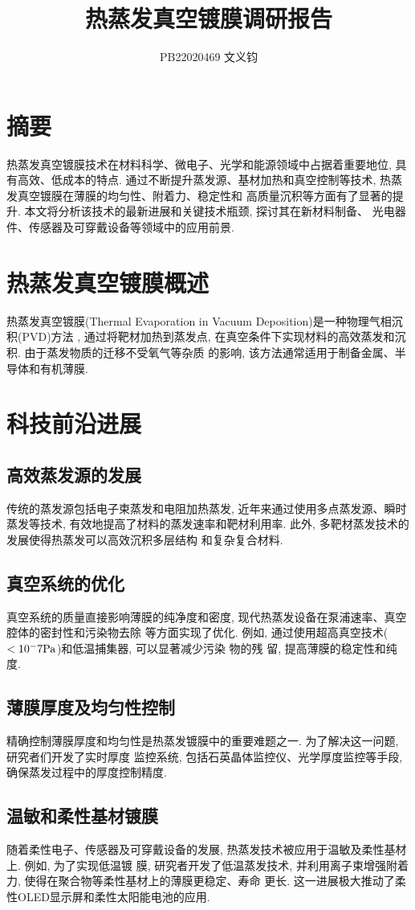\documentclass[UTF8]{ctexart}
\title{热蒸发真空镀膜调研报告}
\author{PB22020469 文义钧}
\begin{document}
\maketitle
\section{摘要}
热蒸发真空镀膜技术在材料科学、微电子、光学和能源领域中占据着重要地位, 具有高效、低成本的特点. 
通过不断提升蒸发源、基材加热和真空控制等技术, 热蒸发真空镀膜在薄膜的均匀性、附着力、稳定性和
高质量沉积等方面有了显著的提升. 本文将分析该技术的最新进展和关键技术瓶颈, 探讨其在新材料制备、
光电器件、传感器及可穿戴设备等领域中的应用前景. 
\section{热蒸发真空镀膜概述}
热蒸发真空镀膜(Thermal Evaporation in Vacuum Deposition)是一种物理气相沉积(PVD)方法
, 通过将靶材加热到蒸发点, 在真空条件下实现材料的高效蒸发和沉积. 由于蒸发物质的迁移不受氧气等杂质
的影响, 该方法通常适用于制备金属、半导体和有机薄膜. 
\section{科技前沿进展}
\subsection{高效蒸发源的发展}
传统的蒸发源包括电子束蒸发和电阻加热蒸发, 近年来通过使用多点蒸发源、瞬时蒸发等技术, 
有效地提高了材料的蒸发速率和靶材利用率. 此外, 多靶材蒸发技术的发展使得热蒸发可以高效沉积多层结构
和复杂复合材料. 
\subsection{真空系统的优化}
真空系统的质量直接影响薄膜的纯净度和密度, 现代热蒸发设备在泵浦速率、真空腔体的密封性和污染物去除
等方面实现了优化. 例如, 通过使用超高真空技术($<10^-7 \rm Pa$)和低温捕集器, 可以显著减少污染
物的残
留, 提高薄膜的稳定性和纯度. 
\subsection{薄膜厚度及均匀性控制}
精确控制薄膜厚度和均匀性是热蒸发镀膜中的重要难题之一. 为了解决这一问题, 研究者们开发了实时厚度
监控系统, 包括石英晶体监控仪、光学厚度监控等手段, 确保蒸发过程中的厚度控制精度. 
\subsection{温敏和柔性基材镀膜}
随着柔性电子、传感器及可穿戴设备的发展, 热蒸发技术被应用于温敏及柔性基材上. 例如, 为了实现低温镀
膜, 研究者开发了低温蒸发技术, 并利用离子束增强附着力, 使得在聚合物等柔性基材上的薄膜更稳定、寿命
更长. 这一进展极大推动了柔性OLED显示屏和柔性太阳能电池的应用. 
\end{document}
